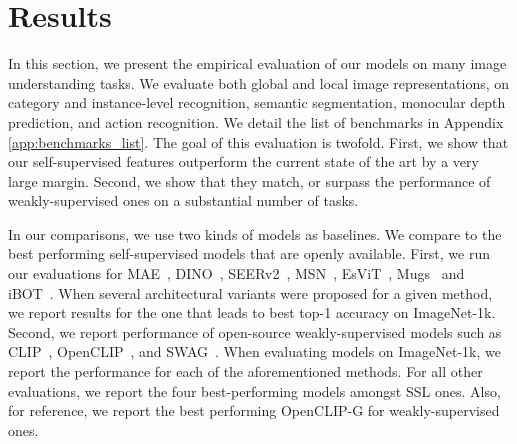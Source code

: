 \section{Results}
\label{sec:results}
In this section, we present the empirical evaluation of our models on many image understanding tasks.
We evaluate both global and local image representations, on category and instance-level recognition, semantic segmentation, monocular depth prediction, and action recognition. 
We detail the list of benchmarks in Appendix \ref{app:benchmarks_list}.
The goal of this evaluation is twofold.
First, we show that our self-supervised features outperform the current state of the art by a very large margin.
Second, we show that they match, or surpass the performance of weakly-supervised ones on a substantial number of tasks.


In our comparisons, we use two kinds of models as baselines.
We compare to the best performing self-supervised models that are openly available.
First, we run our evaluations for MAE~\citep{he2021masked}, DINO~\citep{caron2021emerging}, SEERv2~\citep{goyal2022vision}, MSN~\citep{assran2022masked}, EsViT~\citep{li2021efficient}, Mugs~\citep{zhou2022mugs} and iBOT~\citep{zhou2021ibot}.
When several architectural variants were proposed for a given method, we report results for the one that leads to best top-1 accuracy on ImageNet-1k.
Second, we report performance of open-source weakly-supervised models such as CLIP~\citep{radford2021learning}, OpenCLIP~\citep{ilharco_gabriel_2021_5143773}, and SWAG~\citep{singh2022revisiting}.
When evaluating models on ImageNet-1k, we report the performance for each of the aforementioned methods. 
For all other evaluations, we report the four best-performing models amongst SSL ones.
Also, for reference, we report the best performing OpenCLIP-G for weakly-supervised ones.

